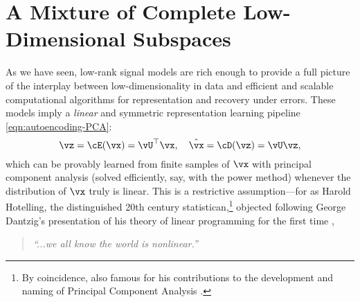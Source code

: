\documentclass[../../book-main.tex]{subfiles}
\begin{document}


\section{A Mixture of Complete Low-Dimensional Subspaces}%
\label{sec:ica}
As we have seen, low-rank signal models are rich enough to provide a full picture of the interplay between low-dimensionality in data and efficient and scalable computational algorithms for representation and recovery under errors. 
These models imply a \textit{linear} and symmetric representation learning pipeline \eqref{eqn:autoencoding-PCA}: 
\begin{equation*}
    \vz = \cE(\vx) = \vU^\top \vx, \quad \hat{\vx} = \cD(\vz) = \vU \vz,
\end{equation*}
which can be provably learned from finite samples of $\vx$ with principal component analysis (solved efficiently, say, with the power method) whenever the distribution of $\vx$ truly is linear.
This is a restrictive assumption---for as Harold Hotelling, the distinguished 20th century statistican,\footnote{By coincidence, also famous for his contributions to the development and naming of Principal Component Analysis \cite{Hotelling1933}.} objected following George Dantzig's presentation of his theory of linear programming for the first time \cite{Dantzig2002-eh},
\begin{quote}
\centering
    \textit{``...we all know the world is nonlinear.''}
\end{quote}
\end{document}
